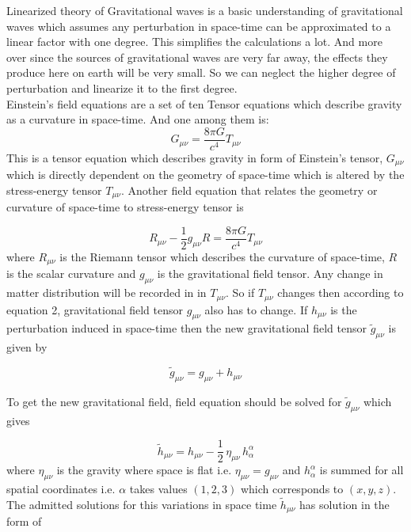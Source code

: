 \linebreak

\linebreak
Linearized theory of Gravitational waves is a basic understanding of gravitational waves which assumes any perturbation in space-time can be approximated to a linear factor with one degree. This simplifies the calculations a lot. And more over since the sources of gravitational waves are very far away, the effects they produce here on earth will be very small. So we can neglect the higher degree of perturbation and linearize it to the first degree. \\

Einstein's field equations are a set of ten Tensor equations which describe gravity as a curvature in space-time. And one among them is: 
\begin{equation}
    G_{\mu\nu}= \frac{8 \pi  G}{c^{4}}  T_{\mu\nu}
\end{equation}
This is a tensor equation which describes gravity in form of Einstein's tensor, $G_{\mu\nu}$ which is directly dependent on the geometry of space-time which is altered by the stress-energy tensor $T_{\mu\nu}$. Another field equation that relates the geometry or curvature of space-time to stress-energy tensor is 

\begin{equation}
    R_{\mu\nu}-\frac{1}{2}g_{\mu\nu}R=\frac{8\pi G}{c^{4}}T_{\mu\nu}
\end{equation}
where $R_{\mu\nu}$ is the Riemann tensor which describes the curvature of space-time, $R$ is the scalar curvature and $g_{\mu\nu}$ is the gravitational field tensor. Any change in matter distribution will be recorded in in $T_{\mu\nu}$. So if $T_{\mu\nu}$ changes then according to equation 2, gravitational field tensor $g_{\mu\nu}$ also has to change. If $h_{\mu\nu}$ is the perturbation induced in space-time then the new gravitational field tensor $\tilde{g}_{\mu\nu}$ is given by 

\begin{equation}
    \tilde{g}_{\mu\nu} = g_{\mu\nu} + h_{\mu\nu}
\end{equation}

\noindent To get the new gravitational field, field equation should be solved for $\tilde{g}_{\mu\nu}$ which gives 

\begin{equation}
    \tilde{h}_{\mu\nu} = h_{\mu\nu} - \frac{1}{2} \, \eta_{\mu\nu} \, h^{\alpha}_{\alpha}
\end{equation}
 where $\eta_{\mu\nu}$ is the gravity where space is flat i.e. $\eta_{\mu\nu} = g_{\mu\nu}$ and $h^{\alpha}_{\alpha}$ is summed for all spatial coordinates i.e. $\alpha$ takes values $(1,2,3) $ which corresponds to $(x,y,z)$. The admitted solutions for this variations in space time $\tilde{h}_{\mu\nu}$ has solution in the form of 
 
